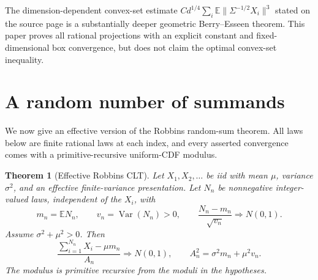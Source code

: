 \documentclass[11pt]{article}
\newtheorem{theorem}{Theorem}[section]
\newcommand{\E}{\mathbb E}
\newcommand{\Var}{\operatorname{Var}}
\begin{document}
The dimension-dependent convex-set estimate
\(C d^{1/4}\sum_i\E\|\Sigma^{-1/2}X_i\|^3\) stated on the source page is a
substantially deeper geometric Berry--Esseen theorem.  This paper proves all
rational projections with an explicit constant and fixed-dimensional box
convergence, but does not claim the optimal convex-set inequality.

\section{A random number of summands}
\label{sec:random-sum}

We now give an effective version of the Robbins random-sum theorem.  All laws
below are finite rational laws at each index, and every asserted convergence
comes with a primitive-recursive uniform-CDF modulus.

\begin{theorem}[Effective Robbins CLT]\label{thm:robbins}
Let \(X_1,X_2,\ldots\) be iid with mean \(\mu\), variance
\(\sigma^2\), and an effective finite-variance presentation.  Let \(N_n\) be
nonnegative integer-valued laws, independent of the \(X_i\), with
\[
 m_n=\E N_n,
 \qquad v_n=\Var(N_n)>0,
 \qquad \frac{N_n-m_n}{\sqrt{v_n}}\Longrightarrow N(0,1).               \tag{13.1}
\]
Assume \(\sigma^2+\mu^2>0\).  Then
\[
 \frac{\sum_{i=1}^{N_n}X_i-\mu m_n}
      {A_n}
 \Longrightarrow N(0,1),
 \qquad A_n^2=\sigma^2m_n+\mu^2v_n.                  \tag{13.2}
\]
The modulus is primitive recursive from the moduli in the hypotheses.
\end{theorem}
\end{document}
